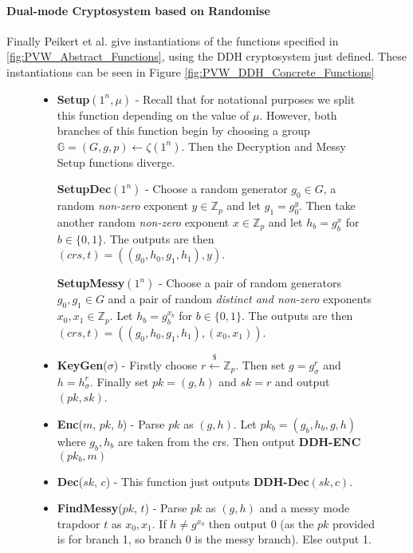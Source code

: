 \documentclass[ %
                    author={Nicholas Tutte},
                supervisor={Prof. Nigel Smart},
                    degree={MEng},
                     title={Secure Two Party Computation},
                  subtitle={A practical comparison of recent protocols},
                      type={Research - GG1K},
                      year={2015} ]{dissertation}
\begin{document}
					\paragraph{Dual-mode Cryptosystem based on Randomise} Finally Peikert et al. give instantiations of the functions specified in \ref{fig:PVW_Abstract_Functions}, using the DDH cryptosystem just defined. These instantiations can be seen in Figure \ref{fig:PVW_DDH_Concrete_Functions}\\

					
					\begin{figure}[!htb]
						\begin{mdframed}
							\centering
							\begin{itemize}
								\item \textbf{Setup}$(1^n, \mu)$ - Recall that for notational purposes we split this function depending on the value of $\mu$. However, both branches of this function begin by choosing a group $\mathbb{G} = (G, g, p) \leftarrow \zeta(1^n)$. Then the Decryption and Messy Setup functions diverge.

								\textbf{SetupDec}$(1^n)$ - Choose a random generator $g_0 \in G$, a random \emph{non-zero} exponent $y \in \mathbb{Z}_p$ and let $g_1 = g_0^y$. Then take another random \emph{non-zero} exponent $x \in \mathbb{Z}_p$ and let $h_b = g_b^x$ for $b \in \{0, 1\}$. The outputs are then $(crs, t) = ( (g_0, h_0, g_1, h_1), y )$.

								\textbf{SetupMessy}$(1^n)$ - Choose a pair of random generators $g_0, g_1 \in G$ and a pair of random \emph{distinct and non-zero} exponents $x_0, x_1 \in \mathbb{Z}_p$. Let $h_b = g_b^{x_b}$ for $b \in \{0, 1\}$.  The outputs are then $(crs, t) = ( (g_0, h_0, g_1, h_1), (x_0, x_1) )$.

								\item \textbf{KeyGen}($\sigma$) - Firstly choose $r \xleftarrow{\$} \mathbb{Z}_p$. Then set $g = g_{\sigma}^r$ and  $h = h_{\sigma}^r$. Finally set $pk = (g, h)$ and $sk = r$ and output $(pk, sk)$.

								\item \textbf{Enc}($m$, $pk$, $b$) - Parse $pk$ as $(g, h)$. Let $pk_b = (g_b, h_b, g, h)$ where $g_b, h_b$ are taken from the crs. Then output \textbf{DDH-ENC}$(pk_b, m)$

								\item \textbf{Dec}($sk$, $c$) - This function just outputs \textbf{DDH-Dec}$(sk, c)$.

								\item \textbf{FindMessy}($pk$, $t$) - Parse $pk$ as $(g, h)$ and a messy mode trapdoor $t$ as $x_0, x_1$. If $h \neq g^{x_0}$ then output 0 (as the $pk$ provided is for branch 1, so branch 0 is the messy branch). Else output 1.


\end{itemize}
\end{mdframed}
\end{figure}
\end{document}
